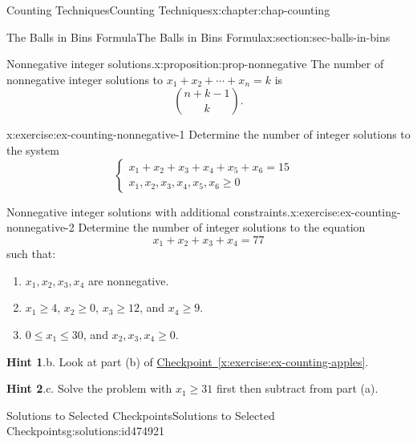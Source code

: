 \documentclass[oneside,10pt,]{book}
\newcommand{\blocktitlefont}{\relax}
\newcommand{\xreffont}{\relax}
\numberwithin{equation}{section}
\newcommand{\amp}{&}
\begin{document}
\begin{chapterptx}{Counting Techniques}{}{Counting Techniques}{}{}{x:chapter:chap-counting}
\begin{sectionptx}{The Balls in Bins Formula}{}{The Balls in Bins Formula}{}{}{x:section:sec-balls-in-bins}
\begin{proposition}{Nonnegative integer solutions.}{}{x:proposition:prop-nonnegative}%
The number of nonnegative integer solutions to \(x_1 + x_2 + \cdots + x_n = k\) is%
\begin{equation*}
\displaystyle\binom{n+k-1}{k}\text{.}
\end{equation*}
%
\end{proposition}
\begin{inlineexercise}{}{x:exercise:ex-counting-nonnegative-1}%
Determine the number of integer solutions to the system%
\begin{equation*}
\begin{cases}
x_1 + x_2 + x_3 + x_4 + x_5 + x_6 = 15 \amp \\ x_1, x_2, x_3, x_4, x_5, x_6 \geq 0 \amp
\end{cases}
\end{equation*}
%
\end{inlineexercise}
\begin{inlineexercise}{Nonnegative integer solutions with additional constraints.}{x:exercise:ex-counting-nonnegative-2}%
Determine the number of integer solutions to the equation%
\begin{equation*}
x_1 + x_2 + x_3 + x_4 = 77
\end{equation*}
such that:%
\begin{enumerate}[label=(\alph*)]
\item{}\(x_1, x_2, x_3, x_4\) are nonnegative.%
\item{}\(x_1 \geq 4\), \(x_2 \geq 0\), \(x_3 \geq 12\), and \(x_4 \geq 9\).%
\item{}\(0 \leq x_1 \leq 30\), and \(x_2, x_3, x_4 \geq 0\).%
\end{enumerate}
%
\par\smallskip%
\noindent\textbf{\blocktitlefont Hint 1}.\hypertarget{g:hint:id474812}{}\quad{}b. Look at part (b) of \hyperref[x:exercise:ex-counting-apples]{Checkpoint~{\xreffont\ref{x:exercise:ex-counting-apples}}}.%
\par\smallskip%
\noindent\textbf{\blocktitlefont Hint 2}.\hypertarget{g:hint:id474839}{}\quad{}c. Solve the problem with \(x_1 \geq 31\) first then subtract from part (a).%
\end{inlineexercise}
%
%
\typeout{************************************************}
\typeout{************************************************}
%
\begin{solutions-subsection}{Solutions to Selected Checkpoints}{}{Solutions to Selected Checkpoints}{}{}{g:solutions:id474921}

\end{solutions-subsection}
\end{sectionptx}
\end{chapterptx}
\end{document}
